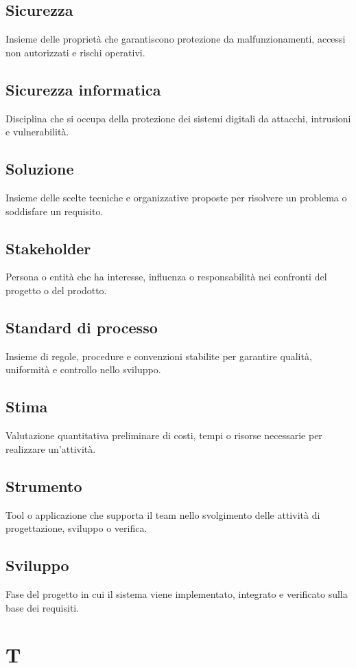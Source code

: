 \documentclass[a4paper,12pt]{article}
\begin{document}
          \subsection*{Sicurezza}
			Insieme delle proprietà che garantiscono protezione da malfunzionamenti, accessi non autorizzati e rischi operativi.
          \subsection*{Sicurezza informatica}
			Disciplina che si occupa della protezione dei sistemi digitali da attacchi, intrusioni e vulnerabilità.
          \subsection*{Soluzione}
			Insieme delle scelte tecniche e organizzative proposte per risolvere un problema o soddisfare un requisito.
          \subsection*{Stakeholder}
			Persona o entità che ha interesse, influenza o responsabilità nei confronti del progetto o del prodotto.
          \subsection*{Standard di processo}
			Insieme di regole, procedure e convenzioni stabilite per garantire qualità, uniformità e controllo nello sviluppo.
          \subsection*{Stima}
			Valutazione quantitativa preliminare di costi, tempi o risorse necessarie per realizzare un'attività.
          \subsection*{Strumento}
			Tool o applicazione che supporta il team nello svolgimento delle attività di progettazione, sviluppo o verifica.
          \subsection*{Sviluppo}
			Fase del progetto in cui il sistema viene implementato, integrato e verificato sulla base dei requisiti.
        
\newpage
        \section{T}
        
\end{document}
